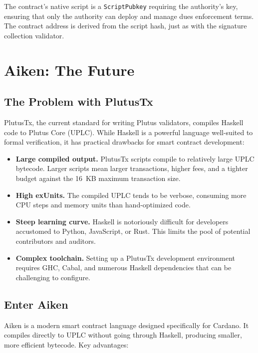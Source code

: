 The contract's native script is a \texttt{ScriptPubkey} requiring the
authority's key, ensuring that only the authority can deploy and manage
dues enforcement terms. The contract address is derived from the script
hash, just as with the signature collection validator.


\section{Aiken: The Future}
\label{sec:aiken}

\subsection{The Problem with PlutusTx}

PlutusTx, the current standard for writing Plutus validators, compiles
Haskell code to Plutus Core (UPLC). While Haskell is a powerful
language well-suited to formal verification, it has practical drawbacks
for smart contract development:

\begin{itemize}[nosep]
  \item \textbf{Large compiled output.} PlutusTx scripts compile to
    relatively large UPLC bytecode. Larger scripts mean larger
    transactions, higher fees, and a tighter budget against the 16~KB
    maximum transaction size.
  \item \textbf{High exUnits.} The compiled UPLC tends to be verbose,
    consuming more CPU steps and memory units than hand-optimized code.
  \item \textbf{Steep learning curve.} Haskell is notoriously difficult
    for developers accustomed to Python, JavaScript, or Rust. This
    limits the pool of potential contributors and auditors.
  \item \textbf{Complex toolchain.} Setting up a PlutusTx development
    environment requires GHC, Cabal, and numerous Haskell dependencies
    that can be challenging to configure.
\end{itemize}

\subsection{Enter Aiken}

Aiken is a modern smart contract language designed specifically for
Cardano. It compiles directly to UPLC without going through Haskell,
producing smaller, more efficient bytecode. Key advantages:

